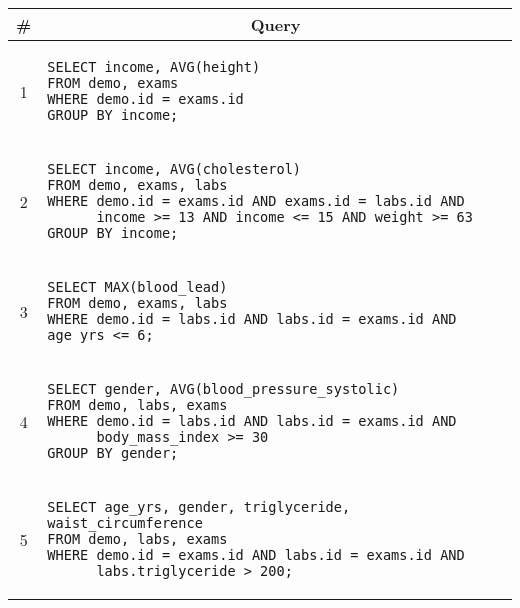 \begin{tabular}{cl}
\toprule
\# & \multicolumn{1}{c}{Query} \\
\midrule
1 & 
\begin{minipage}{6in}
\begin{lstlisting}[breaklines]
SELECT income, AVG(height)
FROM demo, exams
WHERE demo.id = exams.id
GROUP BY income;
\end{lstlisting}
\end{minipage}{queryno} \label{q1} \\
2 & 
\begin{minipage}{6in}
\begin{lstlisting}[breaklines]
SELECT income, AVG(cholesterol)
FROM demo, exams, labs
WHERE demo.id = exams.id AND exams.id = labs.id AND
      income >= 13 AND income <= 15 AND weight >= 63
GROUP BY income;
\end{lstlisting}
\end{minipage}
{queryno} \label{q2} \\
3 & 
\begin{minipage}{6in}
\begin{lstlisting}[breaklines]
SELECT MAX(blood_lead)
FROM demo, exams, labs
WHERE demo.id = labs.id AND labs.id = exams.id AND age_yrs <= 6;
\end{lstlisting}
\end{minipage}{queryno} \label{q3}\\
4 & 
\begin{minipage}{6in}
\begin{lstlisting}[breaklines]
SELECT gender, AVG(blood_pressure_systolic)
FROM demo, labs, exams
WHERE demo.id = labs.id AND labs.id = exams.id AND
      body_mass_index >= 30
GROUP BY gender;
\end{lstlisting}
\end{minipage}{queryno} \label{q4}\\
5 & 
\begin{minipage}{6in}
\begin{lstlisting}[breaklines]
SELECT age_yrs, gender, triglyceride, waist_circumference
FROM demo, labs, exams
WHERE demo.id = exams.id AND labs.id = exams.id AND
      labs.triglyceride > 200;
\end{lstlisting}
\end{minipage}{queryno} \label{q5}\\
\bottomrule
\end{tabular}
